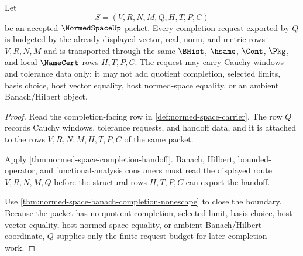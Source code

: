 \begin{theorem}
\label{thm:normed-space-completion-request-budget}
Let
$$
S=(V,R,N,M,Q,H,T,P,C)
$$
be an accepted $\NormedSpaceUp$ packet. Every completion request exported by $Q$ is budgeted by the already displayed vector, real, norm, and metric rows $V,R,N,M$ and is transported through the same $\BHist$, $\hsame$, $\Cont$, $\Pkg$, and local $\NameCert$ rows $H,T,P,C$. The request may carry Cauchy windows and tolerance data only; it may not add quotient completion, selected limits, basis choice, host vector equality, host normed-space equality, or an ambient Banach/Hilbert object.
\end{theorem}
\begin{proof}
Read the completion-facing row in \autoref{def:normed-space-carrier}. The row $Q$ records Cauchy windows, tolerance requests, and handoff data, and it is attached to the rows $V,R,N,M,H,T,P,C$ of the same packet.

Apply \autoref{thm:normed-space-completion-handoff}. Banach, Hilbert, bounded-operator, and functional-analysis consumers must read the displayed route $V,R,N,M,Q$ before the structural rows $H,T,P,C$ can export the handoff.

Use \autoref{thm:normed-space-banach-completion-nonescape} to close the boundary. Because the packet has no quotient-completion, selected-limit, basis-choice, host vector equality, host normed-space equality, or ambient Banach/Hilbert coordinate, $Q$ supplies only the finite request budget for later completion work.
\end{proof}

